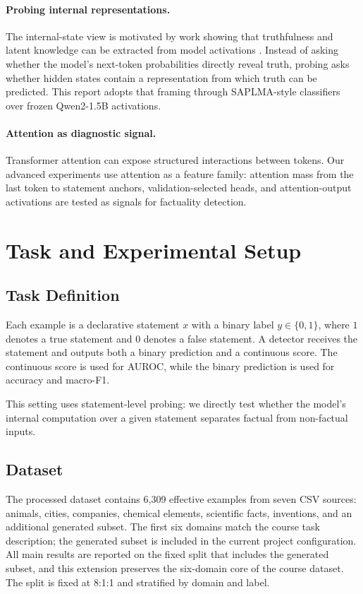 \documentclass[11pt]{article}
\begin{document}
\paragraph{Probing internal representations.}
The internal-state view is motivated by work showing that truthfulness and latent knowledge can be extracted from model activations \citep{azaria2023internal,burns2022discovering}. Instead of asking whether the model's next-token probabilities directly reveal truth, probing asks whether hidden states contain a representation from which truth can be predicted. This report adopts that framing through SAPLMA-style classifiers over frozen Qwen2-1.5B activations.

\paragraph{Attention as diagnostic signal.}
Transformer attention \citep{vaswani2017attention} can expose structured interactions between tokens. Our advanced experiments use attention as a feature family: attention mass from the last token to statement anchors, validation-selected heads, and attention-output activations are tested as signals for factuality detection.

\section{Task and Experimental Setup}

\subsection{Task Definition}

Each example is a declarative statement \(x\) with a binary label \(y \in \{0,1\}\), where \(1\) denotes a true statement and \(0\) denotes a false statement. A detector receives the statement and outputs both a binary prediction and a continuous score. The continuous score is used for AUROC, while the binary prediction is used for accuracy and macro-F1.

This setting uses statement-level probing: we directly test whether the model's internal computation over a given statement separates factual from non-factual inputs.

\subsection{Dataset}

The processed dataset contains 6,309 effective examples from seven CSV sources: animals, cities, companies, chemical elements, scientific facts, inventions, and an additional generated subset. The first six domains match the course task description; the generated subset is included in the current project configuration. All main results are reported on the fixed split that includes the generated subset, and this extension preserves the six-domain core of the course dataset. The split is fixed at 8:1:1 and stratified by domain and label.
\end{document}
